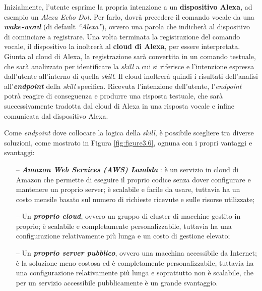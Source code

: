 Inizialmente, l’utente esprime la propria intenzione a un \textbf{dispositivo
Alexa}, ad esempio un \textit{Alexa Echo Dot}. Per farlo, dovrà precedere il
comando vocale da una \textit{\textbf{wake-word}} (di default
\textit{“Alexa”}), ovvero una parola che indicherà al dispositivo di cominciare
a registrare. Una volta terminata la registrazione del comando vocale, il
dispositivo la inoltrerà al \textbf{cloud di Alexa}, per essere interpretata.
Giunta al cloud di Alexa, la registrazione sarà convertita in un comando
testuale, che sarà analizzato per identificare la \textit{skill} a cui si
riferisce e l’intenzione espressa dall’utente all’interno di quella
\textit{skill}. Il cloud inoltrerà quindi i risultati dell’analisi
all’\textit{\textbf{endpoint}} della \textit{skill} specifica. Ricevuta
l’intenzione dell’utente, l’\textit{endpoint} potrà reagire di conseguenza e
produrre una risposta testuale, che sarà successivamente tradotta dal cloud di
Alexa in una risposta vocale e infine comunicata dal dispositivo Alexa.

Come \textit{endpoint} dove collocare la logica della \textit{skill}, è
possibile scegliere tra diverse soluzioni, come mostrato in Figura
\ref{fig:figure3.6}, ognuna con i propri vantaggi e svantaggi:
\begin{itemize}
  \item[--] \textit{\textbf{Amazon Web Services (AWS) Lambda}}
        \cite{AWS_LAMBDA}: è un servizio in cloud di Amazon che permette di
        eseguire il proprio codice senza dover configurare e mantenere un
        proprio server; è scalabile e facile da usare, tuttavia ha un costo
        mensile basato sul numero di richieste ricevute e sulle risorse
        utilizzate;
  \item[--] Un \textit{\textbf{proprio cloud}}, ovvero un gruppo di cluster di
        macchine gestito in proprio; è scalabile e completamente
        personalizzabile, tuttavia ha una configurazione relativamente più
        lunga e un costo di gestione elevato;
  \item[--] Un \textit{\textbf{proprio server pubblico}}, ovvero una macchina
        accessibile da Internet; è la soluzione meno costosa ed è completamente
        personalizzabile, tuttavia ha una configurazione relativamente più
        lunga e soprattutto non è scalabile, che per un servizio accessibile
        pubblicamente è un grande svantaggio.
\end{itemize}

